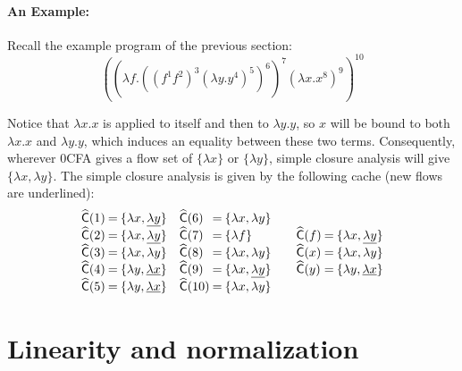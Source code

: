\documentclass{llncs}
\newcommand\cache{\widehat{\mathsf{C}}}
\begin{document}
\paragraph{An Example:}

Recall the example program of the previous section:
\begin{displaymath}
((\lambda f.((f^1 f^2)^3(\lambda y.y^4)^5)^6)^7 (\lambda
x.x^8)^9)^{10}
\end{displaymath}

Notice that $\lambda x.x$ is applied to itself and then to $\lambda
y.y$, so $x$ will be bound to both $\lambda x.x$ and $\lambda y.y$,
which induces an equality between these two terms.  Consequently,
wherever 0CFA gives a flow set of $\{ \lambda x \}$ or $\{ \lambda y
\}$, simple closure analysis will give $\{ \lambda x, \lambda y \}$.
The simple closure analysis is given by the following cache (new flows
are underlined):
\begin{displaymath}
\begin{array}{l@{\:=\:}l@{\hspace{10pt}}l@{\:=\:}l}
\cache(1) & \{ \lambda x, \underline{\lambda y} \} &
\cache(6) & \{ \lambda x, \lambda y \} \\
\cache(2) & \{ \lambda x, \underline{\lambda y} \} &
\cache(7) & \{ \lambda f \} \\
\cache(3) & \{ \lambda x, \lambda y \} &
\cache(8) & \{ \lambda x, \lambda y \} \\
\cache(4) & \{ \lambda y, \underline{\lambda x} \} &
\cache(9) & \{ \lambda x, \underline{\lambda y} \} \\
\cache(5) & \{ \lambda y, \underline{\lambda x} \} &
\cache(10)& \{ \lambda x, \lambda y \}
\end{array}
\hspace{10pt}
\begin{array}{l@{\:=\:}l}
\cache(f) & \{ \lambda x, \underline{\lambda y} \} \\
\cache(x) & \{ \lambda x, \lambda y \}\\
\cache(y) & \{ \lambda y, \underline{\lambda x} \}
\end{array}
\end{displaymath}





\section{Linearity and normalization}
\label{sec:linearity}
\end{document}
